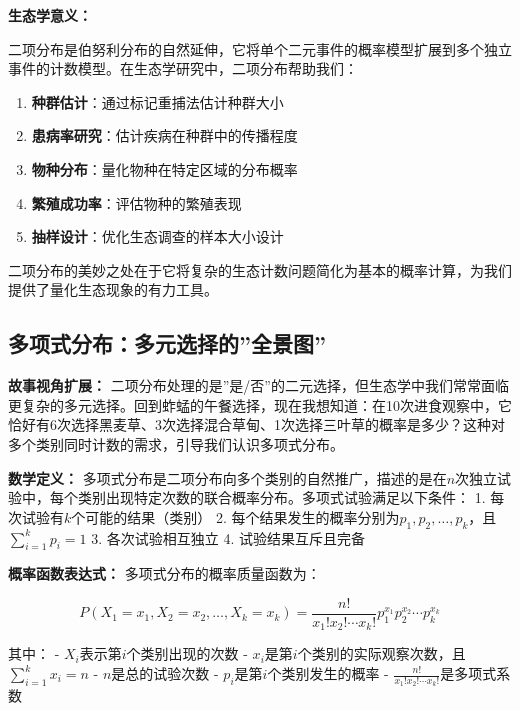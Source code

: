 \documentclass[
]{book}
\providecommand{\tightlist}{%
  \setlength{\itemsep}{0pt}\setlength{\parskip}{0pt}}
\begin{document}
\textbf{生态学意义：}

二项分布是伯努利分布的自然延伸，它将单个二元事件的概率模型扩展到多个独立事件的计数模型。在生态学研究中，二项分布帮助我们：

\begin{enumerate}
\def\labelenumi{\arabic{enumi}.}
\tightlist
\item
  \textbf{种群估计}：通过标记重捕法估计种群大小
\item
  \textbf{患病率研究}：估计疾病在种群中的传播程度
\item
  \textbf{物种分布}：量化物种在特定区域的分布概率
\item
  \textbf{繁殖成功率}：评估物种的繁殖表现
\item
  \textbf{抽样设计}：优化生态调查的样本大小设计
\end{enumerate}

二项分布的美妙之处在于它将复杂的生态计数问题简化为基本的概率计算，为我们提供了量化生态现象的有力工具。

\hypertarget{ux591aux9879ux5f0fux5206ux5e03ux591aux5143ux9009ux62e9ux7684ux5168ux666fux56fe}{%
\subsection{多项式分布：多元选择的''全景图''}\label{ux591aux9879ux5f0fux5206ux5e03ux591aux5143ux9009ux62e9ux7684ux5168ux666fux56fe}}

\textbf{故事视角扩展：} 二项分布处理的是''是/否''的二元选择，但生态学中我们常常面临更复杂的多元选择。回到蚱蜢的午餐选择，现在我想知道：在10次进食观察中，它恰好有6次选择黑麦草、3次选择混合草甸、1次选择三叶草的概率是多少？这种对多个类别同时计数的需求，引导我们认识多项式分布。

\textbf{数学定义：} 多项式分布是二项分布向多个类别的自然推广，描述的是在\(n\)次独立试验中，每个类别出现特定次数的联合概率分布。多项式试验满足以下条件：
1. 每次试验有\(k\)个可能的结果（类别）
2. 每个结果发生的概率分别为\(p_1, p_2, \ldots, p_k\)，且\(\sum_{i=1}^k p_i = 1\)
3. 各次试验相互独立
4. 试验结果互斥且完备

\textbf{概率函数表达式：} 多项式分布的概率质量函数为：

\[P(X_1 = x_1, X_2 = x_2, \ldots, X_k = x_k) = \frac{n!}{x_1! x_2! \cdots x_k!} p_1^{x_1} p_2^{x_2} \cdots p_k^{x_k}\]

其中：
- \(X_i\)表示第\(i\)个类别出现的次数
- \(x_i\)是第\(i\)个类别的实际观察次数，且\(\sum_{i=1}^k x_i = n\)
- \(n\)是总的试验次数
- \(p_i\)是第\(i\)个类别发生的概率
- \(\frac{n!}{x_1! x_2! \cdots x_k!}\)是多项式系数
\end{document}
